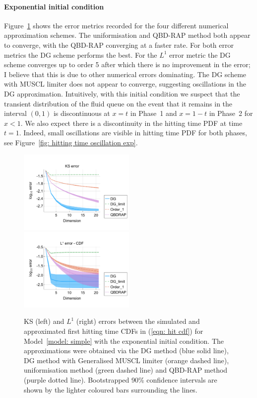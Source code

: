 \paragraph{Exponential initial condition}
Figure~\ref{fig: hitting time exp} shows the error metrics recorded for the four different numerical approximation schemes. The uniformisation and QBD-RAP method both appear to converge, with the QBD-RAP converging at a faster rate. For both error metrics the DG scheme performs the best. For the \(L^1\) error metric the DG scheme converges up to order 5 after which there is no improvement in the error; I believe that this is due to other numerical errors dominating. The DG scheme with MUSCL limiter does not appear to converge, suggesting oscillations in the DG approximation. Intuitively, with this initial condition we suspect that the transient distribution of the fluid queue on the event that it remains in the interval \((0,1)\) is discontinuous at \(x=t\) in Phase~1 and \(x=1-t\) in Phase~2 for \(x<1\). We also expect there is a discontinuity in the hitting time PDF at time \(t=1\). Indeed, small oscillations are visible in hitting time PDF for both phases, see Figure~\ref{fig: hitting time oscillation exp}. 
\begin{figure}[h]
	\centering
	\includegraphics[width=0.5\textwidth,trim={0.75cm 0.8cm 0.25cm 1.25cm},clip]{chapter6/figs/hitting_times_model/hitting_times/exp/ks_error_formatted.pdf}%
	\includegraphics[width=0.5\textwidth,trim={0.75cm 0.8cm 0.25cm 1.25cm},clip]{chapter6/figs/hitting_times_model/hitting_times/exp/l1_cdf_error_formatted.pdf}
	\caption{KS (left) and \(L^1\) (right) errors between the simulated and approximated first hitting time CDFs in (\ref{eqn: hit cdf}) for Model~\ref{model: simple} with the exponential initial condition. The approximations were obtained via the DG method (blue solid line), DG method with Generalised MUSCL limiter (orange dashed line), uniformisation method (green dashed line) and QBD-RAP method (purple dotted line). Bootstrapped 90\% confidence intervals are shown by the lighter coloured bars surrounding the lines.}
	\label{fig: hitting time exp} 
\end{figure}
